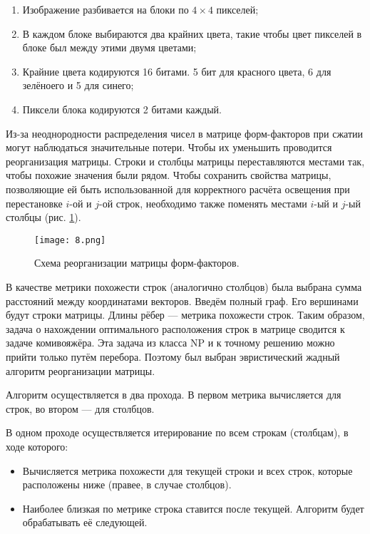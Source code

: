 \documentclass[12pt,fleqn]{article}
\begin{document}
\begin{enumerate}

\item Изображение разбивается на блоки по $4\times4$ пикселей;

\item В каждом блоке выбираются два крайних цвета, такие чтобы цвет пикселей в блоке был между этими двумя цветами;

\item Крайние цвета кодируются 16 битами. 5 бит для красного цвета, 6 для зелёноего и 5 для синего;

\item Пиксели блока кодируются 2 битами каждый.

\end{enumerate}

Из-за неоднородности распределения чисел в матрице форм-факторов при сжатии могут наблюдаться значительные потери. Чтобы их уменьшить проводится реорганизация матрицы. Строки и столбцы матрицы переставляются местами так, чтобы похожие значения были рядом. Чтобы сохранить свойства матрицы, позволяющие ей быть использованной для корректного расчёта освещения при перестановке $i$-ой и $j$-ой строк, необходимо также поменять местами $i$-ый и $j$-ый столбцы (рис. \ref{reorder_scheme}).

\begin{figure}[htb]
    \centering
    \texttt{[image: 8.png]}
    \caption{Схема реорганизации матрицы форм-факторов.}
    \label{reorder_scheme}
\end{figure}

В качестве метрики похожести строк (аналогично столбцов) была выбрана сумма расстояний между координатами векторов. Введём полный граф. Его вершинами будут строки матрицы. Длины рёбер --- метрика похожести строк. Таким образом, задача о нахождении оптимального расположения строк в матрице сводится к задаче комивояжёра. Эта задача из класса NP и к точному решению можно прийти только путём перебора. Поэтому был выбран эвристический жадный алгоритм реорганизации матрицы.

Алгоритм осуществляется в два прохода. В первом метрика вычисляется для строк, во втором --- для столбцов.

В одном проходе осуществляется итерирование по всем строкам (столбцам), в ходе которого:

\begin{itemize}

\item Вычисляется метрика похожести для текущей строки и всех строк, которые расположены ниже (правее, в случае столбцов).

\item Наиболее близкая по метрике строка ставится после текущей. Алгоритм будет обрабатывать её следующей.

\end{itemize}
\end{document}
